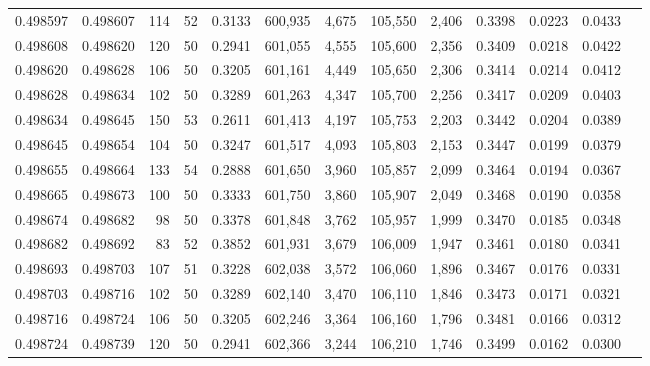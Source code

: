 \begin{tabular}{rrrrrrrrrrrrr}
0.498597 & 0.498607 &   114 &  52 &                                     0.3133 & 600,935 &   4,675 & 105,550 &   2,406 & 0.3398 & 0.0223 & 0.0433 \\
0.498608 & 0.498620 &   120 &  50 &                                     0.2941 & 601,055 &   4,555 & 105,600 &   2,356 & 0.3409 & 0.0218 & 0.0422 \\
0.498620 & 0.498628 &   106 &  50 &                                     0.3205 & 601,161 &   4,449 & 105,650 &   2,306 & 0.3414 & 0.0214 & 0.0412 \\
0.498628 & 0.498634 &   102 &  50 &                                     0.3289 & 601,263 &   4,347 & 105,700 &   2,256 & 0.3417 & 0.0209 & 0.0403 \\
0.498634 & 0.498645 &   150 &  53 &                                     0.2611 & 601,413 &   4,197 & 105,753 &   2,203 & 0.3442 & 0.0204 & 0.0389 \\
0.498645 & 0.498654 &   104 &  50 &                                     0.3247 & 601,517 &   4,093 & 105,803 &   2,153 & 0.3447 & 0.0199 & 0.0379 \\
0.498655 & 0.498664 &   133 &  54 &                                     0.2888 & 601,650 &   3,960 & 105,857 &   2,099 & 0.3464 & 0.0194 & 0.0367 \\
0.498665 & 0.498673 &   100 &  50 &                                     0.3333 & 601,750 &   3,860 & 105,907 &   2,049 & 0.3468 & 0.0190 & 0.0358 \\
0.498674 & 0.498682 &    98 &  50 &                                     0.3378 & 601,848 &   3,762 & 105,957 &   1,999 & 0.3470 & 0.0185 & 0.0348 \\
0.498682 & 0.498692 &    83 &  52 &                                     0.3852 & 601,931 &   3,679 & 106,009 &   1,947 & 0.3461 & 0.0180 & 0.0341 \\
0.498693 & 0.498703 &   107 &  51 &                                     0.3228 & 602,038 &   3,572 & 106,060 &   1,896 & 0.3467 & 0.0176 & 0.0331 \\
0.498703 & 0.498716 &   102 &  50 &                                     0.3289 & 602,140 &   3,470 & 106,110 &   1,846 & 0.3473 & 0.0171 & 0.0321 \\
0.498716 & 0.498724 &   106 &  50 &                                     0.3205 & 602,246 &   3,364 & 106,160 &   1,796 & 0.3481 & 0.0166 & 0.0312 \\
0.498724 & 0.498739 &   120 &  50 &                                     0.2941 & 602,366 &   3,244 & 106,210 &   1,746 & 0.3499 & 0.0162 & 0.0300 \\

\end{tabular}
